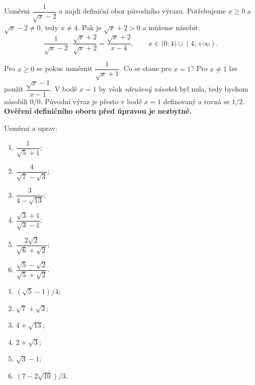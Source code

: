 \documentclass[11pt,a4paper]{article}
\begin{document}
\begin{prikladReseniBox}[breakable=false,title={Rozšiřující příklad 1: přípustné hodnoty proměnné}]
Usměrni $\dfrac1{\sqrt{x}-2}$ a najdi definiční obor původního výrazu.
\tcblower
Potřebujeme $x\ge0$ a $\sqrt x-2\ne0$, tedy $x\ne4$.
Pak je $\sqrt x+2>0$ a můžeme násobit:
\[
\frac1{\sqrt x-2}\cdot\frac{\sqrt x+2}{\sqrt x+2}
=\boxed{\frac{\sqrt x+2}{x-4}},
\qquad x\in\langle0;4)\cup(4;+\infty).
\]
\end{prikladReseniBox}
\begin{zadaniReseniBox}[breakable=false,title={Rozšiřující příklad 2: past s nulovým sdruženým výrazem}]
Pro $x\ge0$ se pokus usměrnit $\dfrac1{\sqrt x+1}$.
Co se stane pro $x=1$?
\tcblower
Pro $x\ne1$ lze použít
$\dfrac{\sqrt x-1}{x-1}$. V bodě $x=1$ by však
\emph{sdružený násobek} byl nula, tedy bychom násobili $0/0$.
Původní výraz je přesto v bodě $x=1$ definovaný a rovná se $1/2$.
\textbf{Ověření definičního oboru před úpravou je nezbytné.}
\end{zadaniReseniBox}

\begin{zadaniReseniBox}[breakable=false,title={Domácí úkol 1: sdružené výrazy}]
Usměrni a uprav:
\begin{enumerate}[label=\alph*)]
\item $\dfrac1{\sqrt5+1}$;
\item $\dfrac4{\sqrt7-\sqrt3}$;
\item $\dfrac3{4-\sqrt{13}}$;
\item $\dfrac{\sqrt3+1}{\sqrt3-1}$;
\item $\dfrac{2\sqrt2}{\sqrt6+\sqrt2}$;
\item $\dfrac{\sqrt5-\sqrt2}{\sqrt5+\sqrt2}$.
\end{enumerate}
\tcblower
\begin{enumerate}[label=\alph*)]
\item $(\sqrt5-1)/4$;
\item $\sqrt7+\sqrt3$;
\item $4+\sqrt{13}$;
\item $2+\sqrt3$;
\item $\sqrt3-1$;
\item $(7-2\sqrt{10})/3$.
\end{enumerate}
\end{zadaniReseniBox}
\end{document}
